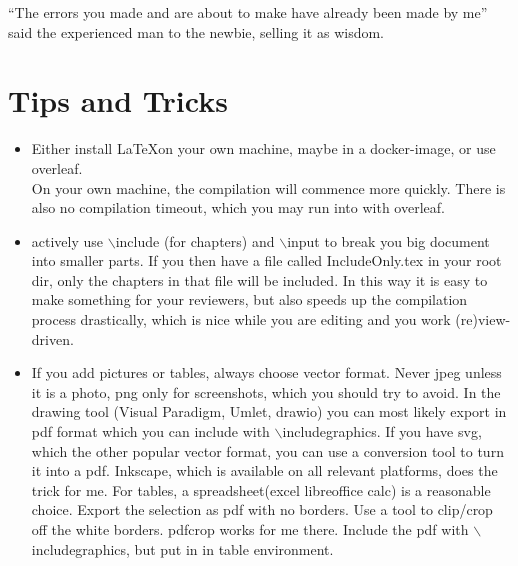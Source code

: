 \begin{savequote}[15cm]
  \vspace{-30mm}
  \raggedleft
\sffamily
``The errors you made and are about to make have already been made by me'' \\said the experienced man to the newbie, selling it as wisdom.
\end{savequote}

\chapter{Tips and Tricks}

\begin{itemize}
\item Either install \LaTeX on your own machine, maybe in a
  docker-image, or use overleaf. \\ 
    On your own machine, the compilation will commence more
    quickly. There is also no compilation timeout, which you may run
    into with overleaf. 
\item actively use $\backslash$include (for chapters) and $\backslash$input to break you 
 big document into smaller parts. If you then have a file called
 IncludeOnly.tex in your root dir, only the chapters in that file will
 be included. In this way it is easy to make something for your
 reviewers, but also speeds up the compilation process drastically,
 which is nice while you are editing and you work (re)view-driven. 
\item If you add pictures or tables, always choose vector
  format. Never jpeg unless it is a photo, png only for screenshots,
  which you should try to avoid. In the drawing tool (Visual Paradigm,
  Umlet, drawio)  you can most likely export in pdf format which you
  can include with $\backslash$includegraphics. If you have svg, which
  the other popular vector format, you can use a conversion tool to
  turn it into a pdf. Inkscape, which is available on all relevant
  platforms, does the trick for me. 
  For tables, a spreadsheet(excel libreoffice calc) is a reasonable
  choice. Export the selection as pdf with no borders.  Use a tool to
  clip/crop off the white borders. pdfcrop works for me there. Include
  the pdf with $\backslash$includegraphics, but put in in table
  environment. 
  
\end{itemize}
